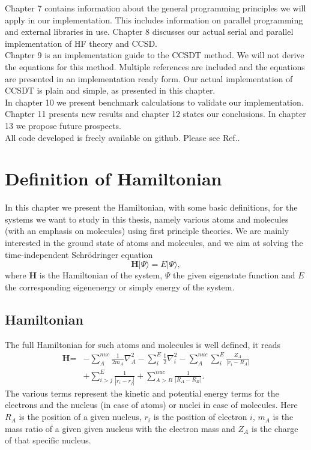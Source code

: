 \documentclass[a4paper,norsk,11pt,twoside]{report}
\begin{document}
Chapter 7 contains information about the general programming
principles we will apply in our implementation. This includes
information on parallel programming and external libraries in
use. Chapter 8 discusses our actual serial and parallel
implementation of HF theory and CCSD.\\

Chapter 9 is an implementation guide to the CCSDT method. We will not
derive the equations for this method. Multiple references are included
and the equations are presented in an implementation ready form. Our
actual implementation of CCSDT is plain and simple, as presented
in this chapter. \\

In chapter 10 we present benchmark calculations to validate our
implementation. Chapter 11 presents new results and chapter 12 states our
conclusions. In chapter 13 we propose future prospects. \\

All code developed is freely available on github. Please see Ref.\cite{my_own_code_shiiiit}. 



\chapter{Definition of Hamiltonian}

In this chapter we present the Hamiltonian, with some basic definitions, for the systems we want to
study in this thesis, namely various atoms and molecules (with an emphasis on molecules) 
using first principle theories. We are mainly
interested in the ground state of atoms and molecules, and we aim at 
solving the time-independent Schr\"odringer equation
\begin{equation}
\textbf{H} |\Psi \rangle = E |\Psi \rangle,
\end{equation}
where $\textbf{H}$ is the Hamiltonian of the system, $\Psi$ the given eigenstate function and $E$ the corresponding
eigenenergy or simply energy  of the system. 

\section{Hamiltonian}
The full Hamiltonian for such atoms and molecules  is well defined, it reads
\begin{align}
\textbf{H} = &
- \sum_A^{nuc} \frac{1}{2m_A} \nabla_A^2
- \sum_i^E \frac{1}{2} \nabla_i^2
- \sum_A^{nuc} \sum_i^E \frac{Z_A}{|r_i - R_A|}
\nonumber \\ &
+ \sum_{i>j}^E \frac{1}{|r_i - r_j|}
+ \sum_{A>B}^{nuc} \frac{1}{|R_A - R_B|}.
\end{align}
The various terms represent the kinetic and potential energy terms for the electrons and the nucleus (in case of atoms) or nuclei in case of molecules. Here $R_A$ is the position of a given nucleus, $r_i$ is the position of electron $i$, $m_A$ is the mass ratio of a given given nucleus with the electron mass and $Z_A$ is the charge of that specific nucleus.
\end{document}
